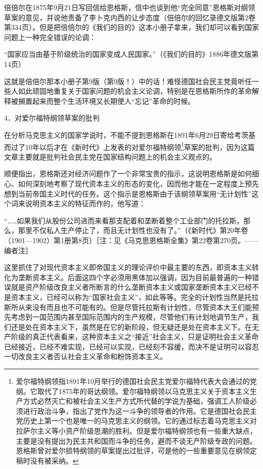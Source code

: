 \documentclass[UTF8, 12pt, a4paper]{ctexrep}
\begin{document}
倍倍尔在1875年9月21日写回信给恩格斯，信中也谈到他“完全同意”恩格斯对纲领草案的意见，并说他责备了李卜克内西的让步态度（倍倍尔的回忆录德文版第2卷第334页）。但是把倍倍尔的《我们的目的》这本小册子拿来，我们却可以看到国家问题上一种完全错误的论调：

“国家应当由基于阶级统治的国家变成人民国家。”（《我们的目的》1886年德文版第14页）

这就是倍倍尔那本小册子第9版（第9版！）中的话！难怪德国社会民主党竟听任一些人如此顽固地重复关于国家问题的机会主义论调，特别是在恩格斯所作的革命解释被搁置起来而整个生活环境又长期使人“忘记”革命的时候。

4．对爱尔福特纲领草案的批判

在分析马克思主义的国家学说时，不能不提到恩格斯在1891年6月29日寄给考茨基而过了10年以后才在《新时代》上发表的对爱尔福特纲领\footnote{爱尔福特纲领指1891年10月举行的德国社会民主党爱尔福特代表大会通过的党纲。它取代了1875年的哥达纲领。爱尔福特纲领以马克思主义关于资本主义生产方式必然灭亡和被社会主义生产方式所代替的学说为基础，强调工人阶级必须进行政治斗争，指出了党作为这一斗争的领导者的作用。它是德国社会民主党历史上第一个也是唯一的马克思主义的纲领。它的通过标志着马克思主义对拉萨尔主义等小资产阶级思潮的胜利。但是爱尔福特纲领也有一些重大缺点，主要是没有提出为民主共和国而斗争的任务，避而不谈无产阶级专政的问题。恩格斯曾对爱尔损特纲领的草案提出过批评，可是他的一些重要意见在纲领定稿时没有被采纳。}草案的批判，因为这篇文章主要就是批判社会民主党在国家结构问题上的机会主义观点的。

顺便指出，恩格斯还对经济问题作了一个非常宝贵的指示，这说明恩格斯是如何细心、如何深刻地考察了现代资本主义的形态的变化，因而他才能在一定程度上预先想到当前帝国主义时代的任务。这个指示是恩格斯由于该纲领草案用“无计划性”这个词来说明资本主义的特征而作的，他写道：

“……如果我们从股份公司进而来看那支配着和垄断着整个工业部门的托拉斯，那么，那里不仅私人生产停止了，而且无计划性也没有了。”（《新时代》第20年卷（1901—1902）第1册第8页）［注：见《马克思恩格斯全集》第22卷第270页。——编者注］

这里抓住了对现代资本主义即帝国主义的理论评价中最主要的东西，即资本主义转化为垄断资本主义。后面这四个字必须用黑体加以强调，因为目前最普遍的一种错误就是资产阶级改良主义者所断言的什么垄断资本主义或国家垄断资本主义已经不是资本主义，已经可以称为“国家社会主义”，如此等等。完全的计划性当然是托拉斯所从来没有而且也不可能有的。但是尽管托拉斯有计划性，尽管资本大王们能预先考虑到一国范围内甚至国际范围内的生产规模，尽管他们有计划地调节生产，我们还是处在资本主义下，虽然是在它的新阶段，但无疑还是处在资本主义下。在无产阶级的真正代表看来，这种资本主义之“接近”社会主义，只是证明社会主义革命已经接近，已经不难实现，已经可以实现，已经刻不容缓，而决不是证明可以容忍一切改良主义者否认社会主义革命和粉饰资本主义。
\end{document}
